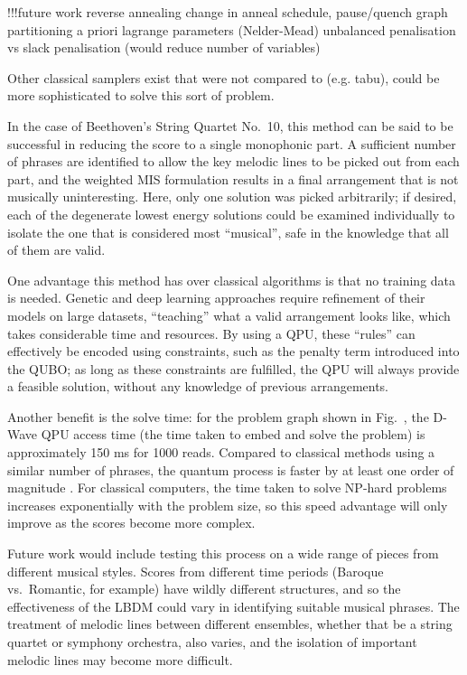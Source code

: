 \documentclass[12pt]{article}
\theoremstyle{definition}
\begin{document}
!!!future work
reverse annealing
change in anneal schedule, pause/quench
graph partitioning
a priori lagrange parameters (Nelder-Mead)
unbalanced penalisation vs slack penalisation (would reduce number of variables)

Other classical samplers exist that were not compared to (e.g. tabu), could be more sophisticated to solve this sort of problem.


In the case of Beethoven's String Quartet No.\ 10, this method can be said to be successful in reducing the score to a single monophonic part. A sufficient number of phrases are identified to allow the key melodic lines to be picked out from each part, and the weighted MIS formulation results in a final arrangement that is not musically uninteresting. Here, only one solution was picked arbitrarily; if desired, each of the degenerate lowest energy solutions could be examined individually to isolate the one that is considered most ``musical'', safe in the knowledge that all of them are valid.

One advantage this method has over classical algorithms is that no training data is needed. Genetic and deep learning approaches require refinement of their models on large datasets, ``teaching'' what a valid arrangement looks like, which takes considerable time and resources. By using a QPU, these ``rules'' can effectively be encoded using constraints, such as the penalty term introduced into the QUBO; as long as these constraints are fulfilled, the QPU will always provide a feasible solution, without any knowledge of previous arrangements.

Another benefit is the solve time: for the problem graph shown in Fig.\  , the D-Wave QPU access time (the time taken to embed and solve the problem) is approximately 150 ms for 1000 reads. Compared to classical methods using a similar number of phrases, the quantum process is faster by at least one order of magnitude . For classical computers, the time taken to solve NP-hard problems increases exponentially with the problem size, so this speed advantage will only improve as the scores become more complex.

Future work would include testing this process on a wide range of pieces from different musical styles. Scores from different time periods (Baroque vs.\ Romantic, for example) have wildly different structures, and so the effectiveness of the LBDM could vary in identifying suitable musical phrases. The treatment of melodic lines between different ensembles, whether that be a string quartet or symphony orchestra, also varies, and the isolation of important melodic lines may become more difficult.
\end{document}
